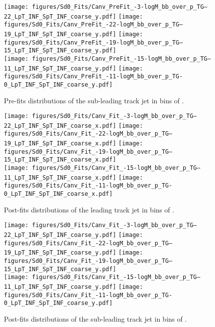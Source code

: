 \begin{figure}[htbp]
  \centering
 \texttt{[image: figures/Sd0\_Fits/Canv\_PreFit\_-3-logM\_bb\_over\_p\_TG--22\_LpT\_INF\_SpT\_INF\_coarse\_y.pdf]}
 \texttt{[image: figures/Sd0\_Fits/Canv\_PreFit\_-22-logM\_bb\_over\_p\_TG--19\_LpT\_INF\_SpT\_INF\_coarse\_y.pdf]}
 \texttt{[image: figures/Sd0\_Fits/Canv\_PreFit\_-19-logM\_bb\_over\_p\_TG--15\_LpT\_INF\_SpT\_INF\_coarse\_y.pdf]}\\
 \texttt{[image: figures/Sd0\_Fits/Canv\_PreFit\_-15-logM\_bb\_over\_p\_TG--11\_LpT\_INF\_SpT\_INF\_coarse\_y.pdf]}
 \texttt{[image: figures/Sd0\_Fits/Canv\_PreFit\_-11-logM\_bb\_over\_p\_TG-0\_LpT\_INF\_SpT\_INF\_coarse\_y.pdf]}

\caption{Pre-fits \sdzero distributions of the sub-leading track jet in bins of \mpt. }
  \label{fig:fracmasspt-prefits-subleading-subsub}
\end{figure}

\begin{figure}[htbp]
  \centering
 \texttt{[image: figures/Sd0\_Fits/Canv\_Fit\_-3-logM\_bb\_over\_p\_TG--22\_LpT\_INF\_SpT\_INF\_coarse\_x.pdf]}
 \texttt{[image: figures/Sd0\_Fits/Canv\_Fit\_-22-logM\_bb\_over\_p\_TG--19\_LpT\_INF\_SpT\_INF\_coarse\_x.pdf]}
 \texttt{[image: figures/Sd0\_Fits/Canv\_Fit\_-19-logM\_bb\_over\_p\_TG--15\_LpT\_INF\_SpT\_INF\_coarse\_x.pdf]}\\
 \texttt{[image: figures/Sd0\_Fits/Canv\_Fit\_-15-logM\_bb\_over\_p\_TG--11\_LpT\_INF\_SpT\_INF\_coarse\_x.pdf]}
 \texttt{[image: figures/Sd0\_Fits/Canv\_Fit\_-11-logM\_bb\_over\_p\_TG-0\_LpT\_INF\_SpT\_INF\_coarse\_x.pdf]}


\caption{Post-fits \sdzero distributions of the leading track jet in bins of \mpt. }
  \label{fig:fracmasspt-postfits-leading-subsub}
\end{figure}


\begin{figure}[htbp]
  \centering
 \texttt{[image: figures/Sd0\_Fits/Canv\_Fit\_-3-logM\_bb\_over\_p\_TG--22\_LpT\_INF\_SpT\_INF\_coarse\_y.pdf]}
 \texttt{[image: figures/Sd0\_Fits/Canv\_Fit\_-22-logM\_bb\_over\_p\_TG--19\_LpT\_INF\_SpT\_INF\_coarse\_y.pdf]}
 \texttt{[image: figures/Sd0\_Fits/Canv\_Fit\_-19-logM\_bb\_over\_p\_TG--15\_LpT\_INF\_SpT\_INF\_coarse\_y.pdf]}\\
 \texttt{[image: figures/Sd0\_Fits/Canv\_Fit\_-15-logM\_bb\_over\_p\_TG--11\_LpT\_INF\_SpT\_INF\_coarse\_y.pdf]}
 \texttt{[image: figures/Sd0\_Fits/Canv\_Fit\_-11-logM\_bb\_over\_p\_TG-0\_LpT\_INF\_SpT\_INF\_coarse\_y.pdf]}

\caption{Post-fits \sdzero distributions of the sub-leading track jet in bins of \mpt. }
  \label{fig:fracmasspt-postfits-subleading-subsub}
\end{figure}



